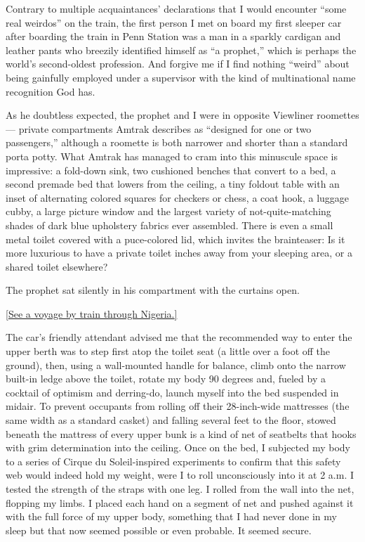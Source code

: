 Contrary to multiple acquaintances' declarations that I would encounter
``some real weirdos'' on the train, the first person I met on board my
first sleeper car after boarding the train in Penn Station was a man in
a sparkly cardigan and leather pants who breezily identified himself as
``a prophet,'' which is perhaps the world's second-oldest profession.
And forgive me if I find nothing ``weird'' about being gainfully
employed under a supervisor with the kind of multinational name
recognition God has.

As he doubtless expected, the prophet and I were in opposite Viewliner
roomettes --- private compartments Amtrak describes as ``designed for
one or two passengers,'' although a roomette is both narrower and
shorter than a standard porta potty. What Amtrak has managed to cram
into this minuscule space is impressive: a fold-down sink, two cushioned
benches that convert to a bed, a second premade bed that lowers from the
ceiling, a tiny foldout table with an inset of alternating colored
squares for checkers or chess, a coat hook, a luggage cubby, a large
picture window and the largest variety of not-quite-matching shades of
dark blue upholstery fabrics ever assembled. There is even a small metal
toilet covered with a puce-colored lid, which invites the brainteaser:
Is it more luxurious to have a private toilet inches away from your
sleeping area, or a shared toilet elsewhere?

The prophet sat silently in his compartment with the curtains open.

\href{https://www.nytimes3xbfgragh.onion/interactive/2015/09/23/magazine/the-voyages-issue.html\#Nigeria}{{[}See
a voyage by train through Nigeria.{]}}

The car's friendly attendant advised me that the recommended way to
enter the upper berth was to step first atop the toilet seat (a little
over a foot off the ground), then, using a wall-mounted handle for
balance, climb onto the narrow built-in ledge above the toilet, rotate
my body 90 degrees and, fueled by a cocktail of optimism and derring-do,
launch myself into the bed suspended in midair. To prevent occupants
from rolling off their 28-inch-wide mattresses (the same width as a
standard casket) and falling several feet to the floor, stowed beneath
the mattress of every upper bunk is a kind of net of seatbelts that
hooks with grim determination into the ceiling. Once on the bed, I
subjected my body to a series of Cirque du Soleil-inspired experiments
to confirm that this safety web would indeed hold my weight, were I to
roll unconsciously into it at 2 a.m. I tested the strength of the straps
with one leg. I rolled from the wall into the net, flopping my limbs. I
placed each hand on a segment of net and pushed against it with the full
force of my upper body, something that I had never done in my sleep but
that now seemed possible or even probable. It seemed secure.

